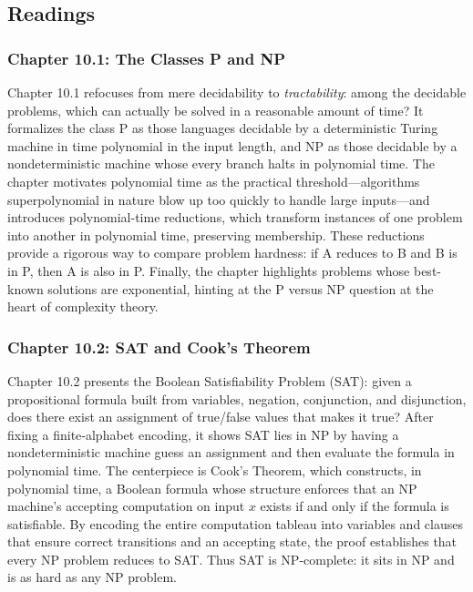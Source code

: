\documentclass{article}
\theoremstyle{theorem}
\theoremstyle{definition}
\theoremstyle{remark}
\begin{document}
\subsection{Readings}
\subsubsection*{Chapter 10.1: The Classes P and NP}
Chapter 10.1 refocuses from mere decidability to \emph{tractability}: among the decidable problems, which can actually be solved in a reasonable amount of time? It formalizes the class P as those languages decidable by a deterministic Turing machine in time polynomial in the input length, and NP as those decidable by a nondeterministic machine whose every branch halts in polynomial time. The chapter motivates polynomial time as the practical threshold—algorithms superpolynomial in nature blow up too quickly to handle large inputs—and introduces polynomial-time reductions, which transform instances of one problem into another in polynomial time, preserving membership. These reductions provide a rigorous way to compare problem hardness: if A reduces to B and B is in P, then A is also in P. Finally, the chapter highlights problems whose best-known solutions are exponential, hinting at the P versus NP question at the heart of complexity theory.

\subsubsection*{Chapter 10.2: SAT and Cook’s Theorem}
Chapter 10.2 presents the Boolean Satisfiability Problem (SAT): given a propositional formula built from variables, negation, conjunction, and disjunction, does there exist an assignment of true/false values that makes it true? After fixing a finite‐alphabet encoding, it shows SAT lies in NP by having a nondeterministic machine guess an assignment and then evaluate the formula in polynomial time. The centerpiece is Cook’s Theorem, which constructs, in polynomial time, a Boolean formula whose structure enforces that an NP machine’s accepting computation on input \(x\) exists if and only if the formula is satisfiable. By encoding the entire computation tableau into variables and clauses that ensure correct transitions and an accepting state, the proof establishes that every NP problem reduces to SAT. Thus SAT is NP-complete: it sits in NP and is as hard as any NP problem.
\end{document}
